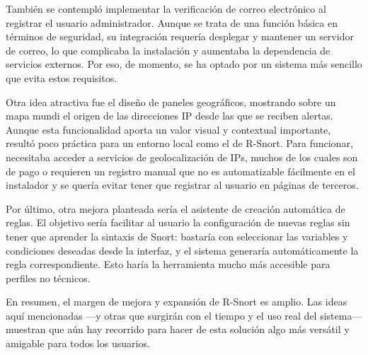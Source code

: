 \documentclass[11pt,a4paper,twoside]{report}
\begin{document}
También se contempló implementar la verificación de correo electrónico al registrar el usuario administrador. Aunque se trata de una función básica en términos de seguridad, su integración requería desplegar y mantener un servidor de correo, lo que complicaba la instalación y aumentaba la dependencia de servicios externos. Por eso, de momento, se ha optado por un sistema más sencillo que evita estos requisitos.\newline

Otra idea atractiva fue el diseño de paneles geográficos, mostrando sobre un mapa mundi el origen de las direcciones IP desde las que se reciben alertas. Aunque esta funcionalidad aporta un valor visual y contextual importante, resultó poco práctica para un entorno local como el de R-Snort. Para funcionar, necesitaba acceder a servicios de geolocalización de IPs, muchos de los cuales son de pago o requieren un registro manual que no es automatizable fácilmente en el instalador y se quería evitar tener que registrar al usuario en páginas de terceros.\newline

Por último, otra mejora planteada sería el asistente de creación automática de reglas. El objetivo sería facilitar al usuario la configuración de nuevas reglas sin tener que aprender la sintaxis de Snort: bastaría con seleccionar las variables y condiciones deseadas desde la interfaz, y el sistema generaría automáticamente la regla correspondiente. Esto haría la herramienta mucho más accesible para perfiles no técnicos.\newline

En resumen, el margen de mejora y expansión de R-Snort es amplio. Las ideas aquí mencionadas —y otras que surgirán con el tiempo y el uso real del sistema— muestran que aún hay recorrido para hacer de esta solución algo más versátil y amigable para todos los usuarios.


\cleardoublepage %
\end{document}
